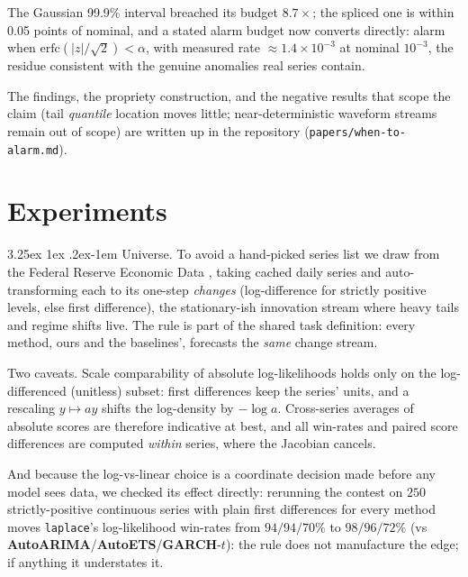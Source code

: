 \documentclass[article]{jss}
\makeatletter
\renewcommand\paragraph{\@startsection{paragraph}{4}{\z@}%
  {3.25ex \@plus1ex \@minus.2ex}{-1em}%
  {\normalfont\normalsize\itshape}}
\providecommand{\pkg}[1]{\textbf{#1}}
\providecommand{\code}[1]{\texttt{#1}}
\makeatother
\begin{document}
The Gaussian 99.9\% interval breached its budget $8.7\times$; the spliced
one is within 0.05 points of nominal, and a stated alarm budget now
converts directly: alarm when $\mathrm{erfc}(|z|/\sqrt{2}) < \alpha$, with
measured rate ${\approx}1.4\times10^{-3}$ at nominal $10^{-3}$, the residue
consistent with the genuine anomalies real series contain.

The findings, the propriety construction, and the negative results that
scope the claim (tail \emph{quantile} location moves little;
near-deterministic waveform streams remain out of scope) are written up in
the repository (\code{papers/when-to-alarm.md}).

\section{Experiments} \label{sec:experiments}

\paragraph{Universe.}
To avoid a hand-picked series list we draw from the Federal Reserve Economic Data
\citep{fred}, taking cached daily series and auto-transforming each to its
one-step \emph{changes} (log-difference for strictly positive levels, else first
difference), the stationary-ish innovation stream where heavy tails and regime
shifts live. The rule is part of the shared task definition: every method, ours
and the baselines', forecasts the \emph{same} change stream.

Two caveats. Scale
comparability of absolute log-likelihoods holds only on the log-differenced
(unitless) subset: first differences keep the series' units, and a rescaling
$y \mapsto ay$ shifts the log-density by $-\log a$. Cross-series averages
of absolute scores are therefore indicative at best, and all win-rates and paired score
differences are computed \emph{within} series, where the Jacobian cancels.

And because the log-vs-linear choice is a coordinate decision made before any
model sees data, we checked its effect directly: rerunning the contest on $250$
strictly-positive continuous series with plain first differences for every
method moves \code{laplace}'s log-likelihood win-rates from $94/94/70\%$ to
$98/96/72\%$ (vs \pkg{AutoARIMA}/\pkg{AutoETS}/\pkg{GARCH}-$t$): the rule
does not manufacture the edge; if anything it understates it.
\end{document}
